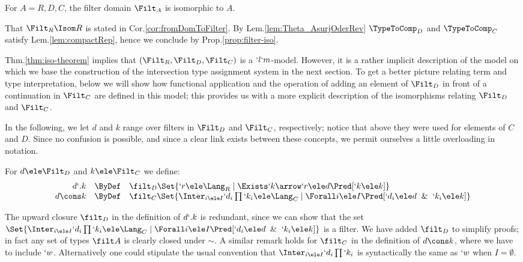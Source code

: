 \documentclass{lmcs}
\begin{document}
 \begin{thm} \label{thm:iso-theorem}
For $A = R,D,C$, the filter domain $\Filt_A$ is isomorphic to $A$.
 \end{thm}

 \begin{Proof}
That $\Filt_R \Isom R$ is stated in Cor.\skp\ref{cor:fromDomToFilter}. By Lem.\skp\ref{lem:Theta_AsurjOderRev}
 $\TypeToComp_D$ and $\TypeToComp_C$ satisfy Lem.\skp\ref{lem:compactRep}, hence we conclude by Prop.\skp\ref{prop:filter-iso}. ~%
 \end{Proof}

Thm.\skp\ref{thm:iso-theorem} implies that $(\Filt_R,\Filt_D,\Filt_C)$ is a $`l`m$-model. However, it is a rather implicit description of the model on which we base the construction of the intersection type assignment system in the next section. 
To get a better picture relating term and type interpretation, below we will show how functional application and the operation of adding an element of $\Filt_D$ in front of a continuation in $\Filt_C$ are defined in this model; this provides us with a more explicit description of the isomorphisms relating $\Filt_D$ and $\Filt_C$.

In the following, we let $d$ and $k$ range over filters in $\Filt_D$ and $\Filt_C$, respectively; notice that above they were used for elements of $C$ and $D$. 
Since no confusion is possible, and since a clear link exists between these concepts, we permit ourselves a little overloading in notation.

 \begin{defi}
For $d \ele \Filt_D$ and $k \ele \Filt_C$ we define:
%
 \[ \begin{array}{rcl}
 d`.k &\ByDef& \filt_D\Set{`r \ele \Lang_R \mid \Exists `k\arrow `r \ele d \Pred[ `k \ele k ] } 
 	\\ %
 d\cons k &\ByDef& \filt_C\Set{\Inter_{i \ele I}`d_i\prod `k_i \ele \Lang_C \mid \Forall i \ele I \Pred[ `d_i \ele d \And `k_i \ele k ] }
 \end{array} \]
 \end{defi}

The upward closure $ \filt_D$ in the definition of $d`.k$ is redundant, since we can show that the set $\Set{\Inter_{i \ele I}`d_i\prod `k_i \ele \Lang_C \mid \Forall i \ele I \Pred[ `d_i \ele d \And `k_i \ele k ] }$ is a filter.
We have added $ \filt_D$ to simplify proofs; in fact any set of types $\filt A$ is clearly closed under $\sim$.
A similar remark holds for $\filt_C$ in the definition of $d\cons k$, where we have to include $`w$. Alternatively one could stipulate the usual convention that $\Inter_{i \ele I}`d_i\prod `k_i$ is syntactically the same as $`w$ when $I=\emptyset$.
\end{document}
